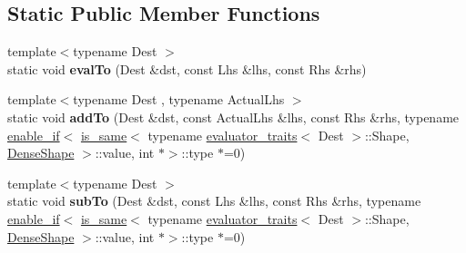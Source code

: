 \subsection*{Static Public Member Functions}
\begin{DoxyCompactItemize}
\item 
\mbox{\label{struct_eigen_1_1internal_1_1generic__product__impl_3_01_lhs_00_01_rhs_00_01_sparse_shape_00_01_s0f15bf86456099378e4a76f37323e721_ae8120253927b82861baf21a731945ca1}} 
{\footnotesize template$<$typename Dest $>$ }\\static void {\bfseries eval\+To} (Dest \&dst, const Lhs \&lhs, const Rhs \&rhs)
\item 
\mbox{\label{struct_eigen_1_1internal_1_1generic__product__impl_3_01_lhs_00_01_rhs_00_01_sparse_shape_00_01_s0f15bf86456099378e4a76f37323e721_ac72445516fbfd85c9ed223e37852a752}} 
{\footnotesize template$<$typename Dest , typename Actual\+Lhs $>$ }\\static void {\bfseries add\+To} (Dest \&dst, const Actual\+Lhs \&lhs, const Rhs \&rhs, typename \hyperlink{struct_eigen_1_1internal_1_1enable__if}{enable\+\_\+if}$<$ \hyperlink{struct_eigen_1_1internal_1_1is__same}{is\+\_\+same}$<$ typename \hyperlink{struct_eigen_1_1internal_1_1evaluator__traits}{evaluator\+\_\+traits}$<$ Dest $>$\+::Shape, \hyperlink{struct_eigen_1_1_dense_shape}{Dense\+Shape} $>$\+::value, int $\ast$$>$\+::type $\ast$=0)
\item 
\mbox{\label{struct_eigen_1_1internal_1_1generic__product__impl_3_01_lhs_00_01_rhs_00_01_sparse_shape_00_01_s0f15bf86456099378e4a76f37323e721_ac8a761eab9d33aa15edd8663ae68144b}} 
{\footnotesize template$<$typename Dest $>$ }\\static void {\bfseries sub\+To} (Dest \&dst, const Lhs \&lhs, const Rhs \&rhs, typename \hyperlink{struct_eigen_1_1internal_1_1enable__if}{enable\+\_\+if}$<$ \hyperlink{struct_eigen_1_1internal_1_1is__same}{is\+\_\+same}$<$ typename \hyperlink{struct_eigen_1_1internal_1_1evaluator__traits}{evaluator\+\_\+traits}$<$ Dest $>$\+::Shape, \hyperlink{struct_eigen_1_1_dense_shape}{Dense\+Shape} $>$\+::value, int $\ast$$>$\+::type $\ast$=0)

\end{DoxyCompactItemize}
